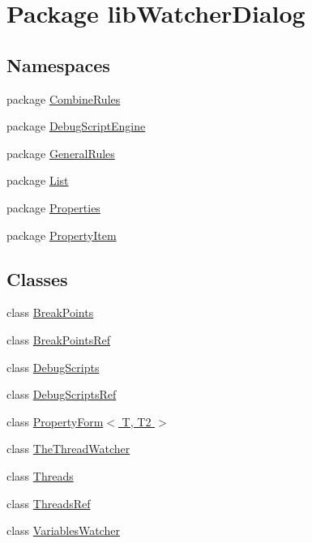 \hypertarget{namespacelib_watcher_dialog}{\section{Package lib\+Watcher\+Dialog}
\label{namespacelib_watcher_dialog}
}
\subsection*{Namespaces}
\begin{DoxyCompactItemize}
\item 
package \hyperlink{namespacelib_watcher_dialog_1_1_combine_rules}{Combine\+Rules}
\item 
package \hyperlink{namespacelib_watcher_dialog_1_1_debug_script_engine}{Debug\+Script\+Engine}
\item 
package \hyperlink{namespacelib_watcher_dialog_1_1_general_rules}{General\+Rules}
\item 
package \hyperlink{namespacelib_watcher_dialog_1_1_list}{List}
\item 
package \hyperlink{namespacelib_watcher_dialog_1_1_properties}{Properties}
\item 
package \hyperlink{namespacelib_watcher_dialog_1_1_property_item}{Property\+Item}
\end{DoxyCompactItemize}
\subsection*{Classes}
\begin{DoxyCompactItemize}
\item 
class \hyperlink{classlib_watcher_dialog_1_1_break_points}{Break\+Points}
\item 
class \hyperlink{classlib_watcher_dialog_1_1_break_points_ref}{Break\+Points\+Ref}
\item 
class \hyperlink{classlib_watcher_dialog_1_1_debug_scripts}{Debug\+Scripts}
\item 
class \hyperlink{classlib_watcher_dialog_1_1_debug_scripts_ref}{Debug\+Scripts\+Ref}
\item 
class \hyperlink{classlib_watcher_dialog_1_1_property_form_3_01_t_00_01_t2_01_4}{Property\+Form$<$ T, T2 $>$}
\item 
class \hyperlink{classlib_watcher_dialog_1_1_the_thread_watcher}{The\+Thread\+Watcher}
\item 
class \hyperlink{classlib_watcher_dialog_1_1_threads}{Threads}
\item 
class \hyperlink{classlib_watcher_dialog_1_1_threads_ref}{Threads\+Ref}
\item 
class \hyperlink{classlib_watcher_dialog_1_1_variables_watcher}{Variables\+Watcher}
\end{DoxyCompactItemize}
